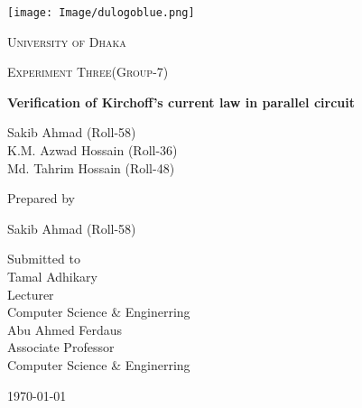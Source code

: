 \documentclass[12pt,a4paper]{report}
\begin{document}
\begin{titlepage}
\centering
\texttt{[image: Image/dulogoblue.png]}\\
{\scshape\LARGE University of Dhaka \par}
\vspace{1cm}
{\scshape\Large Experiment Three(Group-7)\par}
\vspace{1.5cm}
{\huge\bfseries Verification of Kirchoff's current law in parallel circuit\par}
\vspace{2cm}
\vspace{0.5cm}
  {\Large Sakib Ahmad (Roll-58)\\K.M. Azwad Hossain (Roll-36)\\ Md. Tahrim Hossain (Roll-48)\par}
\vspace{0.5cm}
  Prepared by\\
  {\Large Sakib Ahmad (Roll-58)\par}
\vfill
Submitted to \\
\vspace{0.5cm}
  Tamal Adhikary\\ Lecturer\\Computer Science \& Enginerring\\
  \vspace{0.5cm}
  Abu Ahmed Ferdaus \\ Associate Professor\\Computer Science \& Enginerring
\vfill
{\large \today\par}
\end{titlepage}
\end{document}
